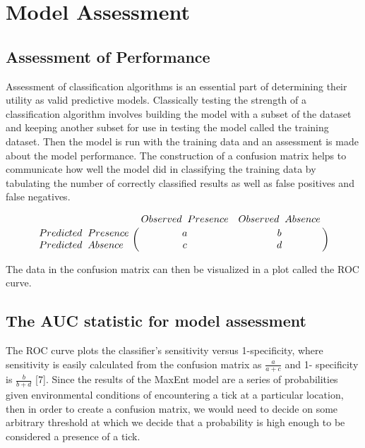 

\section{Model Assessment }  %

\subsection{Assessment of Performance }

Assessment of classification algorithms is an essential part of determining their utility as valid predictive models. Classically testing the strength of a classification algorithm involves building the model with a subset of the dataset and keeping another subset for use in testing the model called the training dataset. Then the model is run with the training data and an assessment is made about the model performance. The construction of a confusion matrix helps to communicate how well the model did in classifying the training data by tabulating the number of correctly classified results as well as false positives and false negatives. 

\begin{equation} \bordermatrix{~ & Observed \hspace{0.2cm} Presence & Observed \hspace{0.2cm} Absence \cr
                  Predicted\hspace{0.2cm}  Presence & a & b \cr
                  Predicted \hspace{0.2cm} Absence & c & d \cr} \end{equation}
                  
\noindent The data in the confusion matrix can then be visualized in a plot called the ROC curve. \newline

\subsection{The AUC statistic for model assessment }

The ROC curve plots the classifier's sensitivity versus 1-specificity, where sensitivity is easily calculated from the confusion matrix as  $\frac{a}{a+c}$ and 1- specificity is $\frac{b}{b+d}$ [7]. Since the results of the MaxEnt model are a series of probabilities given environmental conditions of encountering a tick at a particular location, then in order to create a confusion matrix, we would need to decide on some arbitrary threshold at which we decide that a probability is high enough to be considered a presence of a tick. \newline

